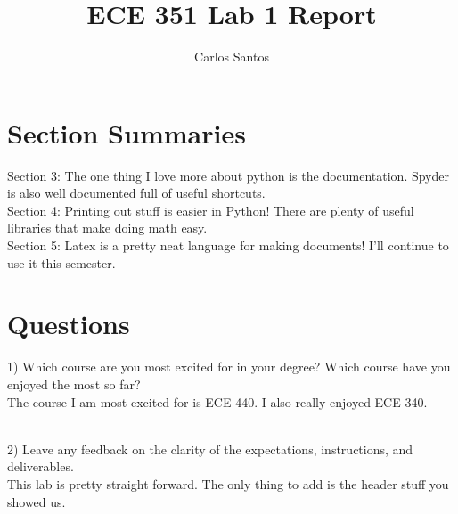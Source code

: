 \documentclass[12pt]{article}
\title{ECE 351 Lab 1 Report}
\author{Carlos Santos}
\begin{document}
\vspace{\fill}
\maketitle
\vspace{\fill}
\clearpage

\section*{Section Summaries}
Section 3: The one thing I love more about python is the documentation. Spyder is also well documented full of useful shortcuts. 
\\
Section 4: Printing out stuff is easier in Python! There are plenty of useful libraries that make doing math easy.
\\
Section 5: Latex is a pretty neat language for making documents! I'll continue to use it this semester. 

\section*{Questions}

1) Which course are you most excited for in your degree? Which course have you enjoyed the most so far?
\\
The course I am most excited for is ECE 440. I also really enjoyed ECE 340.


\\
2) Leave any feedback on the clarity of the expectations, instructions, and deliverables.
\\
This lab is pretty straight forward. The only thing to add is the header stuff you showed us. 
\end{document}
